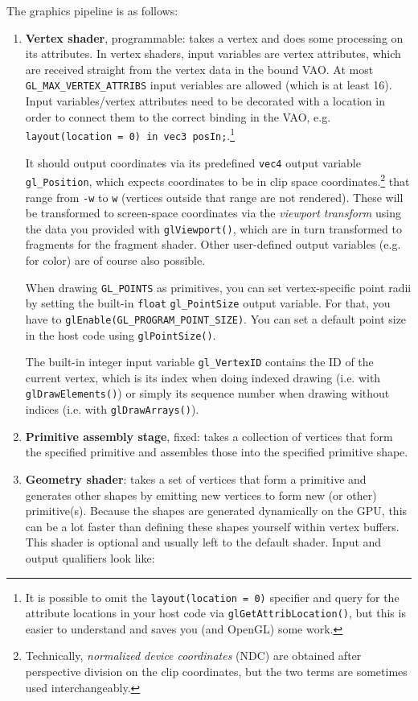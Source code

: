 \documentclass[table, xcdraw]{article}%
\begin{document}
The graphics pipeline is as follows:
\begin{enumerate}
    \item \textbf{Vertex shader}, programmable: takes a vertex and does some processing on its attributes. In vertex shaders, input variables are vertex attributes, which are received straight from the vertex data in the bound VAO. At most \texttt{GL_MAX_VERTEX_ATTRIBS} input veriables are allowed (which is at least 16). Input variables/vertex attributes need to be decorated with a location in order to connect them to the correct binding in the VAO, e.g. \texttt{layout(location = 0) in vec3 posIn;}.\footnote{It is possible to omit the \texttt{layout(location = 0)} specifier and query for the attribute locations in your host code via \texttt{glGetAttribLocation()}, but this is easier to understand and saves you (and OpenGL) some work.}
    
    It should output coordinates via its predefined \texttt{vec4} output variable \texttt{gl_Position}, which expects coordinates to be in clip space coordinates.\footnote{Technically, \emph{normalized device coordinates} (NDC) are obtained after perspective division on the clip coordinates, but the two terms are sometimes used interchangeably.} that range from \texttt{-w} to \texttt{w} (vertices outside that range are not rendered). These will be transformed to screen-space coordinates via the \emph{viewport transform} using the data you provided with \texttt{glViewport()}, which are in turn transformed to fragments for the fragment shader. Other user-defined output variables (e.g. for color) are of course also possible.
    
    When drawing \texttt{GL_POINTS} as primitives, you can set vertex-specific point radii by setting the built-in \texttt{float} \texttt{gl_PointSize} output variable. For that, you have to \texttt{glEnable(GL_PROGRAM_POINT_SIZE)}. You can set a default point size in the host code using \texttt{glPointSize()}.
    
    The built-in integer input variable \texttt{gl_VertexID} contains the ID of the current vertex, which is its index when doing indexed drawing (i.e. with \texttt{glDrawElements()}) or simply its sequence number when drawing without indices (i.e. with \texttt{glDrawArrays()}).
    \item \textbf{Primitive assembly stage}, fixed: takes a collection of vertices that form the specified primitive and assembles those into the specified primitive shape.
    \item \textbf{Geometry shader}: takes a set of vertices that form a primitive and generates other shapes by emitting new vertices to form new (or other) primitive(s). Because the shapes are generated dynamically on the GPU, this can be a lot faster than defining these shapes yourself within vertex buffers. This shader is optional and usually left to the default shader. Input and output qualifiers look like:


\end{enumerate}
\end{document}
